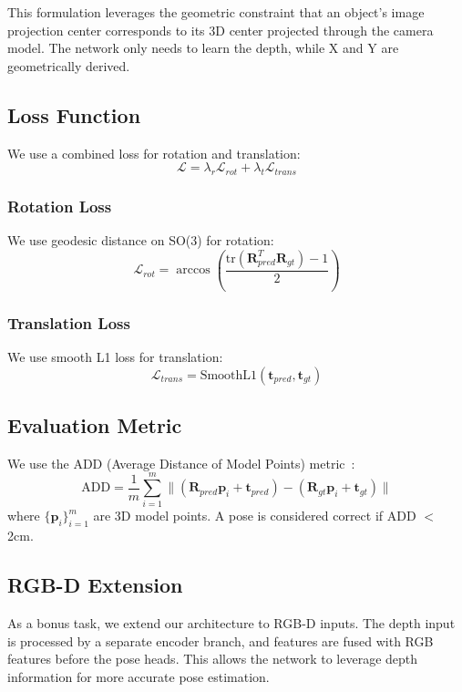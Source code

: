 This formulation leverages the geometric constraint that an object's image projection center corresponds to its 3D center projected through the camera model. The network only needs to learn the depth, while X and Y are geometrically derived.

\subsection{Loss Function}
We use a combined loss for rotation and translation:
\begin{equation}
    \mathcal{L} = \lambda_r \mathcal{L}_{rot} + \lambda_t \mathcal{L}_{trans}
\end{equation}

\subsubsection{Rotation Loss}
We use geodesic distance on SO(3) for rotation:
\begin{equation}
    \mathcal{L}_{rot} = \arccos\left(\frac{\text{tr}(\mathbf{R}_{pred}^T \mathbf{R}_{gt}) - 1}{2}\right)
\end{equation}

\subsubsection{Translation Loss}
We use smooth L1 loss for translation:
\begin{equation}
    \mathcal{L}_{trans} = \text{SmoothL1}(\mathbf{t}_{pred}, \mathbf{t}_{gt})
\end{equation}

\subsection{Evaluation Metric}
We use the ADD (Average Distance of Model Points) metric~\cite{xiang2018posecnn}:
\begin{equation}
    \text{ADD} = \frac{1}{m}\sum_{i=1}^{m} \|(\mathbf{R}_{pred} \mathbf{p}_i + \mathbf{t}_{pred}) - (\mathbf{R}_{gt} \mathbf{p}_i + \mathbf{t}_{gt})\|
\end{equation}
where $\{\mathbf{p}_i\}_{i=1}^m$ are 3D model points. A pose is considered correct if ADD $<$ 2cm.

\subsection{RGB-D Extension}
As a bonus task, we extend our architecture to RGB-D inputs. The depth input is processed by a separate encoder branch, and features are fused with RGB features before the pose heads. This allows the network to leverage depth information for more accurate pose estimation.
